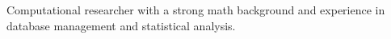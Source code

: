 


\begin{cventries}


\cventry
{} %
{} %
{} %
{} %
{%
Computational researcher with a strong math background and experience in database management and statistical analysis. 
}

\end{cventries}